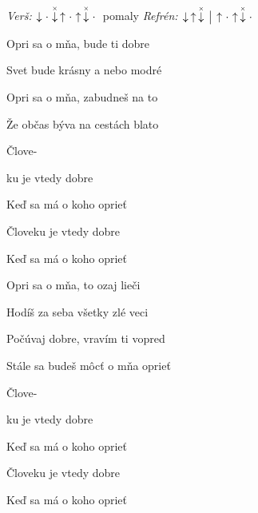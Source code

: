 \begin{song}


\begin{headerbox}
\RaiseBoxWithChucks
\textit{Verš:} $\Down\Miss\ChuckDown\Up\Miss\Up\ChuckDown\Miss$ pomaly \quad
\textit{Refrén:} $\Down\Up\ChuckDown \Separator \Up\Miss\Up\ChuckDown\Miss$
\end{headerbox}

\begin{hchordbox}
\end{hchordbox}

\Large

\bigskip

 Opri sa o mňa,  bude ti dobre \par
{} Svet bude krásny  a nebo modré \par
{} Opri sa o mňa,  zabudneš na to \par
{} Že občas býva na cestách blato \par

\bigskip

 Člove- \par
{}ku je vtedy dobre   \par
Keď sa má o koho oprieť  \par
Človeku je vtedy dobre   \par
Keď sa má o koho oprieť  \par

\bigskip

 Opri sa o mňa,  to ozaj lieči \par
{} Hodíš za seba všetky zlé veci \par
{} Počúvaj dobre,  vravím ti vopred \par
{} Stále sa budeš môcť o mňa oprieť \par

\bigskip

 Člove- \par
{}ku je vtedy dobre   \par
Keď sa má o koho oprieť  \par
Človeku je vtedy dobre   \par
Keď sa má o koho oprieť  \par


\end{song}
